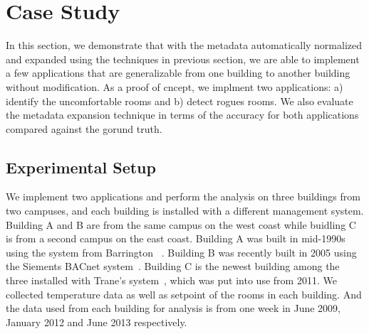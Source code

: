 \section{Case Study}
In this section, we demonstrate that with the metadata automatically normalized and expanded using the techniques in previous section, we are able to implement a few applications that are generalizable from one building to another building without modification. As a proof of cncept, we implment two applications: a) identify the uncomfortable rooms and b) detect rogues rooms. We also evaluate the metadata expansion technique in terms of the accuracy for both applications compared against the gorund truth. 

\subsection{Experimental Setup}
We implement two applications and perform the analysis on three buildings from two campuses, and each building is installed with a different management system. Building A and B are from the same campus on the west coast while buidling C is from a second campus on the east coast. Building A was built in mid-1990s using the system from Barrington ~\cite{}. Building B was recently built in 2005 using the Siements BACnet system~\cite{}. Building C is the newest building among the three installed with Trane's system~\cite{}, which was put into use from 2011. We collected temperature data as well as setpoint of the rooms in each building. And the data used from each building for analysis is from one week in June 2009, January 2012 and June 2013 respectively.

